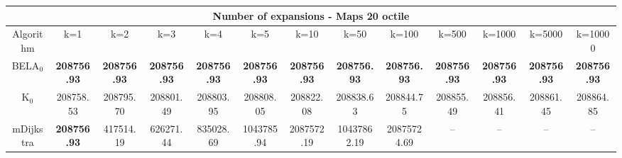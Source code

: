\begin{tabular}{c|cccccccccccc}\toprule
\multicolumn{13}{c}{Number of expansions - Maps 20 octile}\\ \midrule
Algorithm & k=1 & k=2 & k=3 & k=4 & k=5 & k=10 & k=50 & k=100 & k=500 & k=1000 & k=5000 & k=10000 \\ \midrule
BELA$_0$ & \textbf{208756.93} & \textbf{208756.93} & \textbf{208756.93} & \textbf{208756.93} & \textbf{208756.93} & \textbf{208756.93} & \textbf{208756.93} & \textbf{208756.93} & \textbf{208756.93} & \textbf{208756.93} & \textbf{208756.93} & \textbf{208756.93} \\
K$_0$ & 208758.53 & 208795.70 & 208801.49 & 208803.95 & 208808.05 & 208822.08 & 208838.63 & 208844.75 & 208855.49 & 208856.41 & 208861.45 & 208864.85 \\
mDijkstra & \textbf{208756.93} & 417514.19 & 626271.44 & 835028.69 & 1043785.94 & 2087572.19 & 10437862.19 & 20875724.69 & -- & -- & -- & -- \\ \bottomrule 
\end{tabular}
